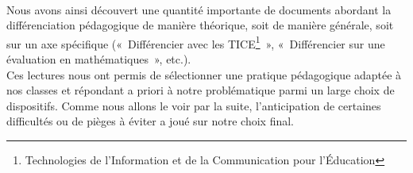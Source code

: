 \paragraph{} Nous avons ainsi découvert une quantité importante de documents abordant la différenciation pédagogique de manière théorique, soit de manière générale, soit sur un axe spécifique (« Différencier avec les TICE\footnote{Technologies de l'Information et de la Communication pour l'Éducation} », « Différencier sur une évaluation en mathématiques », etc.).\\
Ces lectures nous ont permis de sélectionner une pratique pédagogique adaptée à nos classes et répondant a priori à notre problématique parmi un large choix de dispositifs. Comme nous allons le voir par la suite, l'anticipation de certaines difficultés ou de pièges à éviter a joué sur notre choix final.


